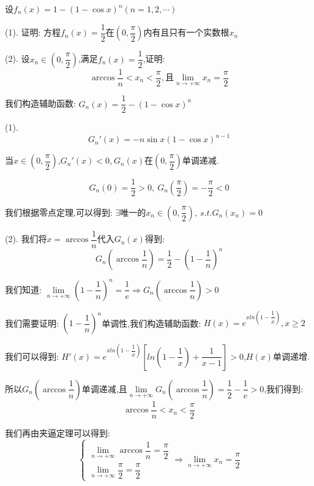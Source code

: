 \begin{proposition}
	设$f_{n}(x)=1-(1-\cos x)^n(n=1,2,\cdots)$

(1). 证明:  方程$f_{n}(x)=\dfrac{1}{2}$在$(0,\dfrac{\pi}{2})$内有且只有一个实数根$x_{n}$

(2). 设$x_{n}\in(0,\dfrac{\pi}{2})$,满足$f_{n}(x)=\dfrac{1}{2}$,证明:  $$\arccos \dfrac{1}{n}<x_{n}<\dfrac{\pi}{2},\text{且}\lim\limits_{n\rightarrow +\infty}x_{n}=\dfrac{\pi}{2}$$
\end{proposition}
\begin{solution}
	
	我们构造辅助函数:  $G_{n}(x)=\dfrac{1}{2}-(1-\cos x)^{n}$
	
	(1). $$G_{n}'(x)=-n\sin x(1-\cos x)^{n-1}$$
	
	当$x\in(0,\dfrac{\pi}{2})$,$G_{n}'(x)<0$,$\ G_{n}(x)$在$(0,\dfrac{\pi}{2})$单调递减.
	
	$$G_{n}(0)=\dfrac{1}{2}>0,\ G_{n}(\dfrac{\pi}{2})=-\dfrac{\pi}{2}<0$$
	
	我们根据零点定理,可以得到:  $\exists \text{唯一的}x_{n}\in(0,\dfrac{\pi}{2}),\ s.t. G_{n}(x_{n})=0$
	
	(2). 我们将$x=\arccos\dfrac{1}{n}$代入$G_{n}(x)$得到:  
	$$G_{n}(\arccos\dfrac{1}{n})=\dfrac{1}{2}-(1-\dfrac{1}{n})^{n}$$
	
	我们知道:  $\lim\limits_{n\rightarrow+\infty}(1-\dfrac{1}{n})^{n}=\dfrac{1}{e}\Rightarrow G_{n}(\arccos\dfrac{1}{n})>0$
	
	我们需要证明:  $(1-\dfrac{1}{n})^n$单调性,我们构造辅助函数:  $H(x)=e^{xln(1-\dfrac{1}{x})},x\geq 2$
	
	我们可以得到:  $H'(x)=e^{xln(1-\dfrac{1}{x})}[ln(1-\dfrac{1}{x})+\dfrac{1}{x-1}]>0$,$H(x)$单调递增.
	
	所以$G_{n}(\arccos\dfrac{1}{n})$单调递减,且$\lim\limits_{n\rightarrow+\infty}G_{n}(\arccos\dfrac{1}{n})=\dfrac{1}{2}-\dfrac{1}{e}>0$,我们得到:  $$\arccos \dfrac{1}{n}<x_{n}<\dfrac{\pi}{2}$$
	
	我们再由夹逼定理可以得到:  
	$$\begin{cases}
		\lim\limits_{n\rightarrow  +\infty}\arccos \dfrac{1}{n}=\dfrac{\pi}{2}\\
		\lim\limits_{n\rightarrow  +\infty}\dfrac{\pi}{2}=\dfrac{\pi}{2}
	\end{cases}
	\Rightarrow \lim\limits_{n\rightarrow +\infty}x_{n}=\dfrac{\pi}{2}$$
	
\end{solution}

